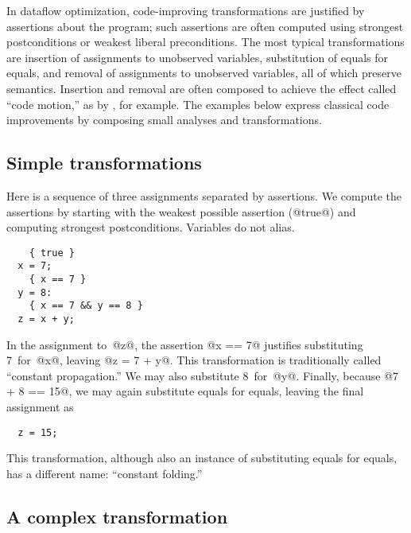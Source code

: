 \documentclass[blockstyle,preprint,natbib,nocopyrightspace]{sigplanconf}
\def\finalremark#1{\relax}
\newcommand\seclabel[1]{\label{sec:#1}}
\begin{document}
\seclabel{example:transforms}
\seclabel{example:xforms}

In dataflow optimization, code-improving transformations are justified
by assertions about the program;
such assertions are often computed using
strongest postconditions or weakest liberal preconditions.
The most typical transformations are
insertion of assignments to unobserved variables,
substitution of equals for equals, 
and
removal of assignments to unobserved variables,
all of which preserve semantics.
Insertion and removal are often composed to achieve the effect called
``code motion,'' as by \citet{knoop:lazy-code-motion}, for example.
The examples below express classical code
improvements by composing small analyses and transformations.



\subsection{Simple transformations}

\seclabel{constant-propagation}

Here is a sequence of three assignments separated by assertions.
We compute the assertions by starting with the weakest possible
assertion (@true@) and computing strongest postconditions.
{Variables do not alias.}
\begin{verbatim}
    { true }
  x = 7;
    { x == 7 }
  y = 8: 
    { x == 7 && y == 8 }
  z = x + y;
\end{verbatim}
In the assignment to~@z@, the assertion @x == 7@ justifies
substituting 7~for~@x@, leaving @z = 7 + y@.  
This transformation is traditionally called ``constant propagation.''
We may also substitute 8~for~@y@.
Finally, because @7 + 8 == 15@, we may again substitute equals for
equals, leaving the final assignment as
\begin{verbatim}
  z = 15;
\end{verbatim}
This transformation, although also an instance of substituting equals
for equals, has a different name: ``constant folding.''

\subsection{A complex transformation}

\finalremark{It's a pity that this transformation occupies nearly the
entire second page,  
and then plays no subsequent role in the paper whatsoever.
One possibility: move it to ``the next 700'' section, as a substantiating example
to the claims made there.
But then we'd need another example here... well the sink/reload example of
Section 4 might be perfect.}
\end{document}
